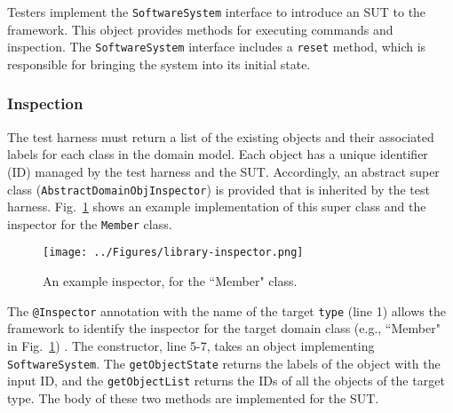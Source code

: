 Testers implement the \texttt{SoftwareSystem} interface to introduce an SUT to the framework.
This object provides methods for executing commands and inspection. The \texttt{SoftwareSystem} interface includes a \texttt{reset} method, which is responsible for bringing the system into its initial state. %



\subsubsection{Inspection}
\label{sec:test-harness-inspection}
The test harness must return a list of the existing objects and their associated labels for each class in the domain model. Each object has a unique identifier (ID) managed by the test harness and the SUT. Accordingly, an abstract super class (\texttt{AbstractDomainObjInspector})  is provided that is inherited by the test harness. Fig.~\ref{fig:library-inspector} shows an example implementation of this super class and the inspector for the \texttt{Member} class.

\begin{figure}[h]
\centering
\texttt{[image: ../Figures/library-inspector.png]}
\caption{An example inspector, for the ``Member" class.}
\label{fig:library-inspector}
\end{figure}

The \texttt{@Inspector} annotation with the name of the target \texttt{type} (line 1) allows the framework to identify the inspector for the target domain class (e.g., ``Member" in Fig.~\ref{fig:library-inspector}) . The constructor, line 5-7, takes an object implementing \texttt{SoftwareSystem}. The \texttt{getObjectState} returns the labels of the object with the input ID, and the \texttt{getObjectList} returns the IDs of all the objects of the target type. The body of these two methods are implemented for the SUT.

